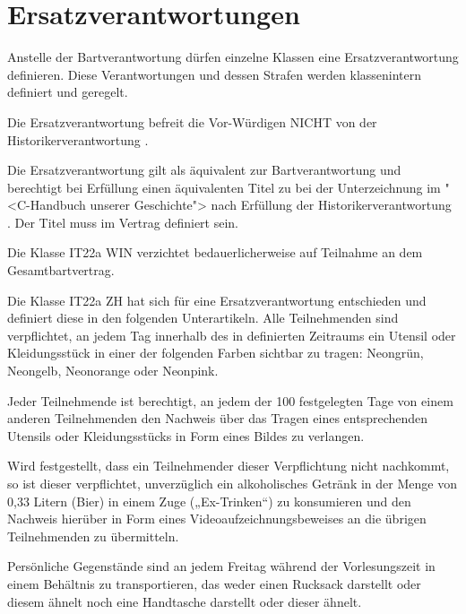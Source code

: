 \documentclass[fontsize=12pt,parskip=half]{scrartcl}
\begin{document}
\section{Ersatzverantwortungen}
\begin{contract}
  \Clause[title={Ersatzverantwortung}]\label{ersatz}
  Anstelle der Bartverantwortung dürfen einzelne Klassen eine Ersatzverantwortung definieren. Diese Verantwortungen und dessen Strafen werden klassenintern
  definiert und geregelt.

  Die Ersatzverantwortung befreit die Vor-Würdigen NICHT von der Historikerverantwortung .

  Die Ersatzverantwortung gilt als äquivalent zur Bartverantwortung und berechtigt bei Erfüllung einen äquivalenten Titel zu  bei der Unterzeichnung
  im "<C-Handbuch unserer Geschichte"> nach Erfüllung der Historikerverantwortung . Der Titel muss im Vertrag definiert sein.

  \Clause[title={Klasse IT22a WIN}]
  Die Klasse IT22a WIN verzichtet bedauerlicherweise auf Teilnahme an dem Gesamtbartvertrag.

  \Clause[title={Klasse IT22a ZH}]\label{KlasseIT22aZH.ersatz}
  Die Klasse IT22a ZH hat sich für eine Ersatzverantwortung entschieden und definiert diese in den folgenden Unterartikeln.
  \SubClause[title={Tragepflicht von Utensilien/Kleidungsstücken in Neonfarben}]\label{KlasseIT22aZH.clothing}
  Alle Teilnehmenden sind verpflichtet, an jedem Tag innerhalb des in  definierten Zeitraums ein Utensil oder Kleidungsstück in einer der folgenden Farben sichtbar zu tragen: Neongrün, Neongelb, Neonorange oder Neonpink.

  Jeder Teilnehmende ist berechtigt, an jedem der 100 festgelegten Tage von einem anderen Teilnehmenden den Nachweis über das Tragen eines entsprechenden Utensils oder Kleidungsstücks in Form eines Bildes zu verlangen.

  Wird festgestellt, dass ein Teilnehmender dieser Verpflichtung nicht nachkommt, so ist dieser verpflichtet, unverzüglich ein alkoholisches Getränk in der Menge von 0,33 Litern (Bier) in einem Zuge („Ex-Trinken“) zu
  konsumieren und den Nachweis hierüber in Form eines Videoaufzeichnungsbeweises an die übrigen Teilnehmenden zu übermitteln.

  \SubClause[title={Transportpflicht persönlicher Gegenstände an Freitagen}]\label{KlasseIT22aZH.transport}
  Persönliche Gegenstände sind an jedem Freitag während der Vorlesungszeit in einem Behältnis zu transportieren, das weder einen Rucksack darstellt oder diesem ähnelt noch eine Handtasche darstellt oder dieser ähnelt.


\end{contract}
\end{document}
